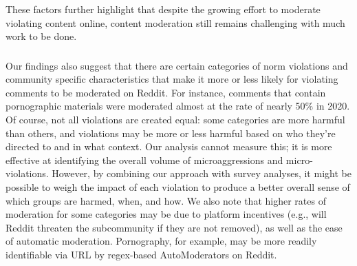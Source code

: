  These factors further highlight that despite the growing effort to moderate violating content online, content moderation still remains challenging with much work to be done. 

\subsubsection{}
Our findings also suggest that there are certain categories of norm violations and community specific characteristics that make it more or less likely for violating comments to be moderated on Reddit. For instance, comments that contain pornographic materials were moderated almost at the rate of nearly 50\% in 2020. Of course, not all violations are created equal: some categories are more harmful than others, and violations may be more or less harmful based on who they're directed to and in what context. Our analysis cannot measure this; it is more effective at identifying the overall volume of microaggressions and micro-violations. However, by combining our approach with survey analyses, it might be possible to weigh the impact of each violation to produce a better overall sense of which groups are harmed, when, and how. We also note that higher rates of moderation for some categories may be due to platform incentives (e.g., will Reddit threaten the subcommunity if they are not removed), as well as the ease of automatic moderation. Pornography, for example, may be more readily identifiable via URL by regex-based AutoModerators on Reddit. 


